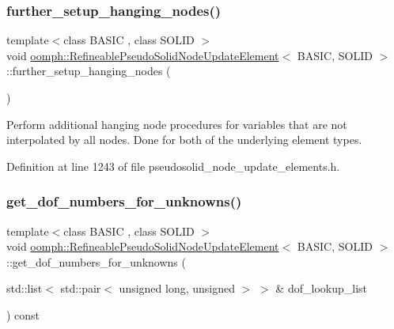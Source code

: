 \subsubsection{\texorpdfstring{further\+\_\+setup\+\_\+hanging\+\_\+nodes()}{further\_setup\_hanging\_nodes()}}
{\footnotesize\ttfamily template$<$class B\+A\+S\+IC , class S\+O\+L\+ID $>$ \\
void \hyperlink{classoomph_1_1RefineablePseudoSolidNodeUpdateElement}{oomph\+::\+Refineable\+Pseudo\+Solid\+Node\+Update\+Element}$<$ B\+A\+S\+IC, S\+O\+L\+ID $>$\+::further\+\_\+setup\+\_\+hanging\+\_\+nodes (\begin{DoxyParamCaption}{ }\end{DoxyParamCaption})\hspace{0.3cm}{\ttfamily [inline]}}



Perform additional hanging node procedures for variables that are not interpolated by all nodes. Done for both of the underlying element types. 



Definition at line 1243 of file pseudosolid\+\_\+node\+\_\+update\+\_\+elements.\+h.

\mbox{\label{classoomph_1_1RefineablePseudoSolidNodeUpdateElement_a4b59bb716a54bc8d174d68f2ed70e151}} 
\subsubsection{\texorpdfstring{get\+\_\+dof\+\_\+numbers\+\_\+for\+\_\+unknowns()}{get\_dof\_numbers\_for\_unknowns()}}
{\footnotesize\ttfamily template$<$class B\+A\+S\+IC , class S\+O\+L\+ID $>$ \\
void \hyperlink{classoomph_1_1RefineablePseudoSolidNodeUpdateElement}{oomph\+::\+Refineable\+Pseudo\+Solid\+Node\+Update\+Element}$<$ B\+A\+S\+IC, S\+O\+L\+ID $>$\+::get\+\_\+dof\+\_\+numbers\+\_\+for\+\_\+unknowns (\begin{DoxyParamCaption}\item[{std\+::list$<$ std\+::pair$<$ unsigned long, unsigned $>$ $>$ \&}]{dof\+\_\+lookup\+\_\+list }\end{DoxyParamCaption}) const\hspace{0.3cm}{\ttfamily [inline]}}



